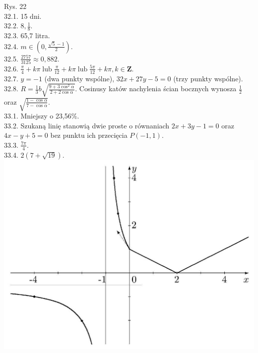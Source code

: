 \documentclass[10pt]{article}
\begin{document}
Rys. 22\\
32.1. 15 dni.\\
32.2. $8, \frac{1}{8}$.\\
32.3. 65,7 litra.\\
32.4. $m \in\left(0, \frac{\sqrt{5}-1}{2}\right)$.\\
32.5. $\frac{2757}{3125} \approx 0,882$.\\
32.6. $\frac{\pi}{4}+k \pi \operatorname{lub} \frac{\pi}{12}+k \pi \operatorname{lub} \frac{5 \pi}{12}+k \pi, k \in \mathbf{Z}$.\\
32.7. $y=-1$ (dwa punkty wspólne), $32 x+27 y-5=0$ (trzy punkty wspólne).\\
32.8. $R=\frac{1}{3} b \sqrt{\frac{9+3 \cos ^{2} \alpha}{2+2 \cos \alpha}}$. Cosinusy katów nachylenia ścian bocznych wynosza $\frac{1}{2}$ oraz $\sqrt{\frac{1-\cos \alpha}{7-\cos \alpha}}$.\\
33.1. Mniejszy o 23,56\%.\\
33.2. Szukaną linię stanowią dwie proste o równaniach $2 x+3 y-1=0$ oraz $4 x-y+5=0$ bez punktu ich przecięcia $P(-1,1)$.\\
33.3. $\frac{7 \pi}{4}$.\\
33.4. $2(7+\sqrt{19})$.\\
\includegraphics[max width=\textwidth, center]{2024_11_16_fe5b564401bf7db98894g-078}
\end{document}
